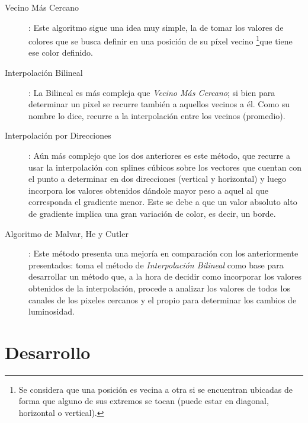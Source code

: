 \documentclass[a4paper]{article}
\begin{document}
\begin{description}

\item[Vecino Más Cercano]: Este algoritmo sigue una idea muy simple, la de tomar los valores de colores que se busca definir en una posición de su píxel vecino \footnote{Se considera que una posición es vecina a otra si se encuentran ubicadas de forma que alguno de sus extremos se tocan (puede estar en diagonal, horizontal o vertical).}que tiene ese color definido.\\

\item[Interpolación Bilineal]: La Bilineal es más compleja que \textit{Vecino Más Cercano}; si bien para determinar un pixel se recurre también a aquellos vecinos a él. Como su nombre lo dice, recurre a la interpolación entre los vecinos (promedio).\\ %

\item[Interpolación por Direcciones]: Aún más complejo que los dos anteriores es este método, que recurre a usar la interpolación con splines cúbicos sobre los vectores que cuentan con el punto a determinar en dos direcciones (vertical y horizontal) y luego incorpora los valores obtenidos dándole mayor peso a aquel al que corresponda el gradiente menor. Este se debe a que un valor absoluto alto de gradiente implica una gran variación de color, es decir, un borde.

\item[Algoritmo de Malvar, He y Cutler]: Este método presenta una mejoría en comparación con los anteriormente presentados: toma el método de \textit{Interpolación Bilineal} como base para desarrollar un método que, a la hora de decidir como incorporar los valores obtenidos de la interpolación, procede a analizar los valores de todos los canales de los pixeles cercanos y el propio para determinar los cambios de luminosidad.\\

\end{description}


\newpage

\section{Desarrollo}
\label{sec:desarrollo}
\end{document}
